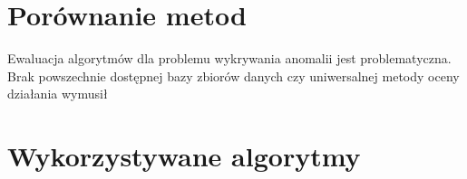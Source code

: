 \section{Porównanie metod}
Ewaluacja algorytmów dla problemu wykrywania anomalii jest problematyczna. Brak powszechnie dostępnej bazy zbiorów danych czy uniwersalnej metody oceny działania wymusił 
\section{Wykorzystywane algorytmy}